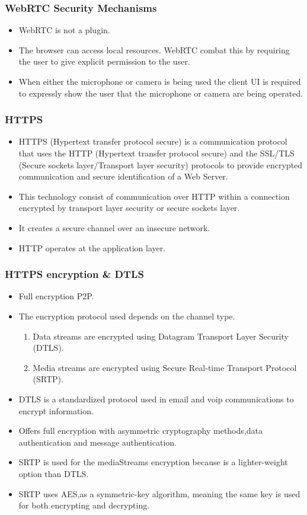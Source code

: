 \begin{frame}[fragile]\frametitle{WebRTC Security Mechanisms}
\begin{itemize}
\item WebRTC is not a plugin.
\item The browser can access local resources. WebRTC combat this by requiring the user to give explicit permission to the user.
\item When either the microphone or camera is being used the client UI is required to expressly show the user that the microphone 
or camera are being operated.
\end{itemize}
\end{frame}

\begin{frame}[fragile]\frametitle{HTTPS}
\begin{itemize}
\item HTTPS (Hypertext transfer protocol secure) is a communication protocol that uses the HTTP (Hypertext transfer protocol secure) and the SSL/TLS
(Secure sockets layer/Transport layer security) protocols to provide encrypted communication and secure identification of a Web Server.
\item This technology consist of communication over HTTP within a connection encrypted by transport layer security or secure sockets layer.
\item It creates a secure channel over an insecure network.
\item HTTP operates at the application layer. 
\end{itemize}
\end{frame}

\begin{frame}[fragile]\frametitle{HTTPS encryption \& DTLS}
\begin{itemize}
\small
\item Full encryption P2P.
\item The encryption protocol used depends on the channel type.
  \begin{enumerate}
  \footnotesize
  \item Data streams are encrypted using Datagram Transport Layer Security (DTLS).
  \item Media streams are encrypted using Secure Real-time Transport Protocol (SRTP).
  \end{enumerate}
\item DTLS is a standardized protocol used in email and voip communications to encrypt information. 
\item Offers full encryption with asymmetric cryptography methods,data authentication and message authentication.
\item SRTP is used for the mediaStreams encryption because is a lighter-weight option than DTLS.
\item SRTP uses AES,as a symmetric-key algorithm, meaning the same key 
is used for both encrypting and decrypting.
\end{itemize}
\end{frame}

